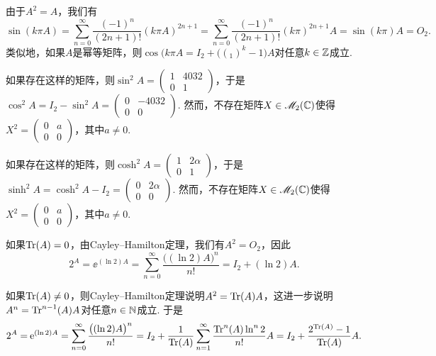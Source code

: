 \begin{solution}
  由于$A^2=A$，我们有
  \[
    \sin(k\pi A) = \sum_{n=0}^\infty \frac{(-1)^n}{(2n+1)!} (k\pi A)^{2n+1} =
    \sum_{n=0}^\infty \frac{(-1)^n}{(2n+1)!} (k\pi)^{2n+1}A = \sin(k\pi) A = O_2.
  \]
  类似地，如果$A$是幂等矩阵，则$\cos(k\pi A=I_2+\big((_1)^k-1\big)A$对任意$k\in\mathbb Z$成立.
\end{solution}

\begin{solution}
  \begin{inparaenum}[(a)]
    \item 如果存在这样的矩阵，则$\sin^2A=\begin{pmatrix}
          1 & 4032 \\
          0 & 1
        \end{pmatrix}$，于是$\cos^2A=I_2-\sin^2A=\begin{pmatrix}
          0 & -4032 \\
          0 & 0
        \end{pmatrix}$. 然而，不存在矩阵$X\in\mathscr M_2(\mathbb C)$使得$X^2=\begin{pmatrix}
          0 & a \\
          0 & 0
        \end{pmatrix}$，其中$a\ne0$.

    \item 如果存在这样的矩阵，则$\cosh^2A=\begin{pmatrix}
          1 & 2\alpha \\
          0 & 1
        \end{pmatrix}$，于是$\sinh^2A=\cosh^2A-I_2
        =\begin{pmatrix}
          0 & 2\alpha \\
          0 & 0
        \end{pmatrix}$. 然而，不存在矩阵$X\in\mathscr M_2(\mathbb C)$使得$X^2=\begin{pmatrix}
          0 & a \\
          0 & 0
        \end{pmatrix}$，其中$a\ne0$.
  \end{inparaenum}
\end{solution}

\begin{solution}
  如果$\operatorname{Tr}(A)=0$，由Cayley--Hamilton定理，我们有$A^2=O_2$，因此
  \[
    2^A = \ee^{(\ln2)A} = \sum_{n=0}^\infty \frac{\big((\ln2)A\big)^n}{n!} = I_2 + (\ln2)A.
  \]

  如果$\operatorname{Tr}(A)\ne0$，则Cayley--Hamilton定理说明$A^2=\operatorname{Tr}(A)A$，这进一步说明$A^n=\operatorname{Tr}^{n-1}(A)A$对任意$n\in\mathbb N$成立. 于是
  \[
    2^A = \operatorname{\!\!\;\mathrm e}^{(\ln2)A} = \sum_{n=0}^\infty \frac{\big((\ln2)A\big)^n}{n!} = I_2 + \frac1{\operatorname{Tr}(A)}
    \sum_{n=1}^\infty \frac{\operatorname{Tr}^n(A)\ln^n2}{n!}A
    = I_2 + \frac{2^{\operatorname{Tr}(A)}-1}{\operatorname{Tr}(A)}A.
  \]
\end{solution}

